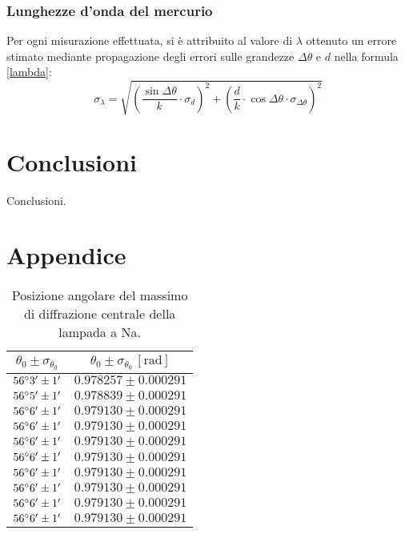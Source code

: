 \documentclass[]{article}
\let\oldsection\section%
\renewcommand{\section}{%
	\renewcommand{\theequation}{\thesection.\arabic{equation}}%
	\oldsection}%
\begin{document}
    \subsubsection{Lunghezze d'onda del mercurio}
    Per ogni misurazione effettuata, si è attribuito al valore di $\lambda$ ottenuto un errore stimato mediante propagazione degli errori sulle grandezze $\Delta \theta$ e $d$ nella formula \ref{lambda}:
    \begin{equation}
        \label{lambda-error}
        \sigma_{\lambda} = \sqrt{\left( \frac{\sin{\Delta\theta}}{k}  \cdot \sigma_d \right)^2 + \left(\frac{d}{k} \cdot \cos{\Delta\theta} \cdot \sigma_{\Delta\theta}\right)^2  } 
    \end{equation}
    \label{par:errore_lambda}

    \section{Conclusioni}
    Conclusioni.

    \newpage

    \section*{Appendice}

    \begin{table}[H]
        \centering
        \begin{tabular}{||c|c||}
            \hline
            $\theta_0 \pm \sigma_{\theta_0}$ & $\theta_0 \pm \sigma_{\theta_0} \, \left[\text{rad}\right]$ \\\hline
            \hline
            $56\degree 3' \pm 1'$ & $0.978257 \pm 0.000291$ \\\hline
            $56\degree 5' \pm 1'$ & $0.978839 \pm 0.000291$ \\\hline
            $56\degree 6' \pm 1'$ & $0.979130 \pm 0.000291$ \\\hline
            $56\degree 6' \pm 1'$ & $0.979130 \pm 0.000291$ \\\hline
            $56\degree 6' \pm 1'$ & $0.979130 \pm 0.000291$ \\\hline
            $56\degree 6' \pm 1'$ & $0.979130 \pm 0.000291$ \\\hline
            $56\degree 6' \pm 1'$ & $0.979130 \pm 0.000291$ \\\hline
            $56\degree 6' \pm 1'$ & $0.979130 \pm 0.000291$ \\\hline
            $56\degree 6' \pm 1'$ & $0.979130 \pm 0.000291$ \\\hline
            $56\degree 6' \pm 1'$ & $0.979130 \pm 0.000291$ \\\hline
        \end{tabular}
        \caption{Posizione angolare del massimo di diffrazione centrale della lampada a Na.}
        \label{prel-max-c}
    \end{table}
\end{document}
